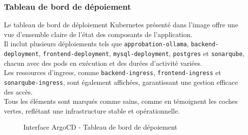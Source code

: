 \subsubsection{Tableau de bord de dépoiement}
Le tableau de bord de déploiement Kubernetes présenté dans l'image offre une vue d'ensemble claire de l'état des composants de l'application.\\
Il inclut plusieurs déploiements tels que \texttt{approbation-ollama}, \texttt{backend-deployment}, \texttt{frontend-deployment}, \texttt{mysql-deployment}, \texttt{postgres} et \texttt{sonarqube}, chacun avec des pods en exécution et des durées d'activité variées.\\
Les ressources d'ingress, comme \texttt{backend-ingress}, \texttt{frontend-ingress} et \texttt{sonarqube-ingress}, sont également affichées, garantissant une gestion efficace des accès.\\
Tous les éléments sont marqués comme sains, comme en témoignent les coches vertes, reflétant une infrastructure stable et opérationnelle.
\newpage
\begin{figure}[h]
    \vspace*{-1.5cm}
    \begin{adjustwidth}{-3.5cm}{-3.5cm}
    \centering
    \caption{Interface ArgoCD - Tableau de bord de dépoiement}
    \label{fig:argo4}
    \end{adjustwidth}
\end{figure}
